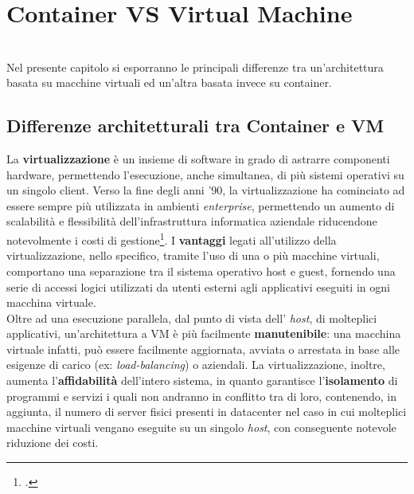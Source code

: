 
\chapter{Container VS Virtual Machine}
\label{cap:container-vm}

\\
Nel presente capitolo si esporranno le principali differenze tra un'architettura basata su macchine virtuali ed un'altra basata invece su container.

\section{Differenze architetturali tra Container e VM}
La \textbf{virtualizzazione} è un insieme di software in grado di astrarre componenti \gls{hardware}, permettendo l'esecuzione, anche simultanea, di più \gls{sistemi operativi} su un singolo \gls{client}. Verso la fine degli anni '90, la virtualizzazione ha cominciato ad essere sempre più utilizzata in ambienti \textit{enterprise}, permettendo un aumento di scalabilità e flessibilità dell'infrastruttura informatica aziendale riducendone notevolmente i costi di gestione\footcite{fonte: https://www.vmware.com/it/solutions/virtualization.html}. I \textbf{vantaggi} legati all'utilizzo della virtualizzazione, nello specifico, tramite l'uso di una o più macchine virtuali, comportano una separazione tra il sistema operativo \gls{host} e \gls{guest}, fornendo una serie di accessi logici utilizzati da utenti esterni agli applicativi eseguiti in ogni macchina virtuale. \\Oltre ad una esecuzione parallela, dal punto di vista dell' \textit{host}, di molteplici applicativi, un'architettura a VM è più facilmente \textbf{manutenibile}: una macchina virtuale infatti, può essere facilmente aggiornata, avviata o arrestata in base alle esigenze di carico (ex: \textit{load-balancing}) o aziendali.
La virtualizzazione, inoltre, aumenta l'\textbf{affidabilità} dell'intero sistema, in quanto garantisce l'\textbf{isolamento} di programmi e servizi i quali non andranno in conflitto tra di loro, contenendo, in aggiunta, il numero di server fisici presenti in \gls{datacenter} nel caso in cui molteplici macchine virtuali vengano eseguite su un singolo \textit{host}, con conseguente notevole riduzione dei costi.
